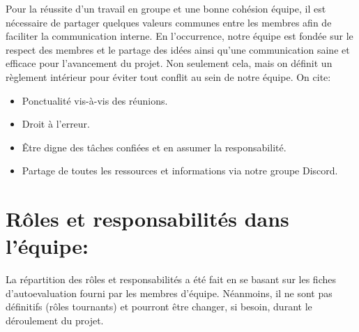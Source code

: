 \documentclass[12pt]{article}
\begin{document}
Pour la réussite d’un travail en groupe et une bonne cohésion équipe, il est nécessaire de partager quelques valeurs communes entre les membres afin de faciliter la communication interne. 
En l'occurrence, notre équipe est fondée sur le respect des membres et le partage des idées ainsi qu’une communication saine et efficace pour l’avancement du projet. 
Non seulement cela, mais on définit un règlement intérieur pour éviter tout conflit au sein de notre équipe. On cite: \ \begin{itemize}
    \item Ponctualité vis-à-vis des réunions.
    \item Droit à l’erreur.
    \item Être digne des tâches confiées et en assumer la responsabilité.
    \item Partage de toutes les ressources et informations via notre groupe Discord.
\end{itemize}


\section{\textbf{Rôles et responsabilités dans l’équipe:}}
La répartition des rôles et responsabilités a été fait en se basant sur les fiches d'autoevaluation fourni par les membres d'équipe. Néanmoins, il ne sont pas définitifs (rôles tournants) et pourront être changer, si besoin, durant le déroulement du projet.
\end{document}
